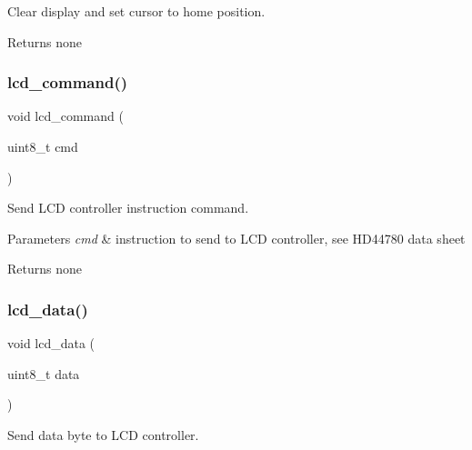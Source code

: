 Clear display and set cursor to home position. 

\begin{DoxyReturn}{Returns}
none 
\end{DoxyReturn}
\mbox{\label{group__pfleury__lcd_gaea9d14f02df06f948cb5a56776980826}} 
\subsubsection{\texorpdfstring{lcd\+\_\+command()}{lcd\_command()}}
{\footnotesize\ttfamily void lcd\+\_\+command (\begin{DoxyParamCaption}\item[{uint8\+\_\+t}]{cmd }\end{DoxyParamCaption})}



Send L\+CD controller instruction command. 


\begin{DoxyParams}{Parameters}
{\em cmd} & instruction to send to L\+CD controller, see H\+D44780 data sheet \\
\hline
\end{DoxyParams}
\begin{DoxyReturn}{Returns}
none 
\end{DoxyReturn}
\mbox{\label{group__pfleury__lcd_gad0729d2cba627825a089ca1fff12ba29}} 
\subsubsection{\texorpdfstring{lcd\+\_\+data()}{lcd\_data()}}
{\footnotesize\ttfamily void lcd\+\_\+data (\begin{DoxyParamCaption}\item[{uint8\+\_\+t}]{data }\end{DoxyParamCaption})}



Send data byte to L\+CD controller. 


